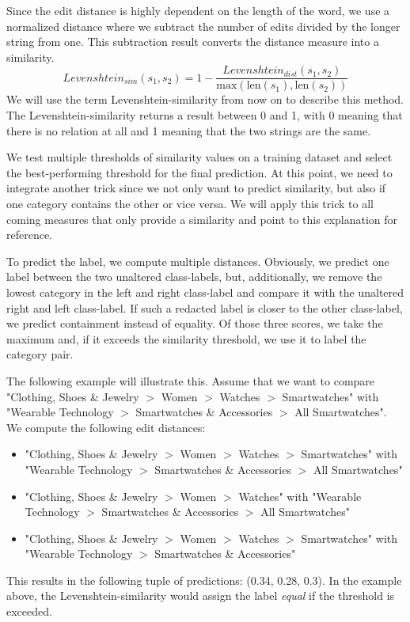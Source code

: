 Since the edit distance is highly dependent on the length of the word, we use a normalized
distance where we subtract the number of edits divided by the longer string from one.
This subtraction result converts the distance measure into a similarity.
\begin{equation*}
Levenshtein_{sim}(s_1, s_2) = 1 - \frac{Levenshtein_{dist}(s_1, s_2)}{\mbox{max}(\mbox{len}(s_1), \mbox{len}(s_2))}
\end{equation*}
We will use the term Levenshtein-similarity from now on to describe this method.
The Levenshtein-similarity returns a result between 0 and 1, with 0 meaning that there is no relation at all
and 1 meaning that the two strings are the same.

We test multiple thresholds of similarity values on a training dataset and select the best-performing threshold for the final
prediction.
At this point, we need to integrate another trick since we not only want to predict similarity,
but also if one category contains the other or vice versa.
We will apply this trick to all coming measures that only provide a similarity and point to this explanation for reference.

To predict the label, we compute multiple distances.
Obviously, we predict one label between the two unaltered class-labels, but, additionally, we remove the lowest category
in the left and right class-label and compare it with the unaltered right and left class-label.
If such a redacted label is closer to the other class-label, we predict containment instead of equality.
Of those three scores, we take the maximum and, if it exceeds the similarity threshold, we use it to label the category pair.

The following example will illustrate this.
Assume that we want to compare "Clothing, Shoes \& Jewelry $>$ Women $>$ Watches $>$ Smartwatches" with
"Wearable Technology $>$ Smartwatches \& Accessories $>$ All Smartwatches".
We compute the following edit distances:
\begin{itemize}
    \item "Clothing, Shoes \& Jewelry $>$ Women $>$ Watches $>$ Smartwatches" with "Wearable Technology $>$ Smartwatches \& Accessories $>$ All Smartwatches"
    \item "Clothing, Shoes \& Jewelry $>$ Women $>$ Watches" with "Wearable Technology $>$ Smartwatches \& Accessories $>$ All Smartwatches"
    \item "Clothing, Shoes \& Jewelry $>$ Women $>$ Watches $>$ Smartwatches" with "Wearable Technology $>$ Smartwatches \& Accessories"
\end{itemize}
This results in the following tuple of predictions: (0.34, 0.28, 0.3).
In the example above, the Levenshtein-similarity would assign the label \emph{equal} if the threshold is exceeded.

